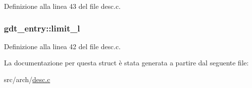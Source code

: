 Definizione alla linea 43 del file desc.\+c.

\hypertarget{structgdt__entry_aac421dd71cee241d3c91179d679e477c}{
\subsubsection[{limit\+\_\+l}]{ gdt\+\_\+entry\+::limit\+\_\+l}}\label{structgdt__entry_aac421dd71cee241d3c91179d679e477c}


Definizione alla linea 42 del file desc.\+c.



La documentazione per questa struct è stata generata a partire dal seguente file\+:\begin{DoxyCompactItemize}
\item 
src/arch/\hyperlink{desc_8c}{desc.\+c}\end{DoxyCompactItemize}
